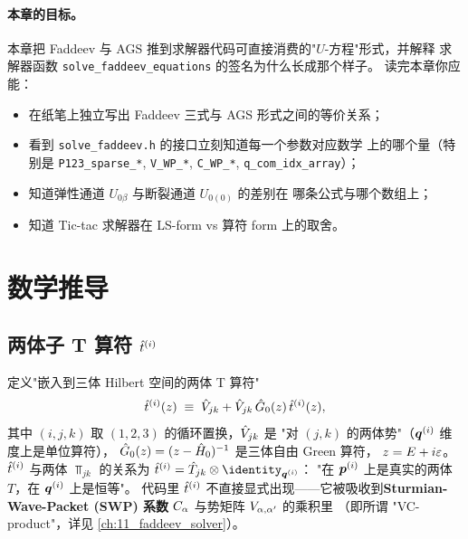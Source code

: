 \paragraph{本章的目标。}
本章把 Faddeev 与 AGS 推到求解器代码可直接消费的"\(U\)-方程"形式，并解释
求解器函数 \texttt{solve\_faddeev\_equations} 的签名为什么长成那个样子。
读完本章你应能：
\begin{itemize}
  \item 在纸笔上独立写出 Faddeev 三式与 AGS 形式之间的等价关系；
  \item 看到 \texttt{solve\_faddeev.h} 的接口立刻知道每一个参数对应数学
        上的哪个量（特别是 \texttt{P123\_sparse\_*}, \texttt{V\_WP\_*},
        \texttt{C\_WP\_*}, \texttt{q\_com\_idx\_array}）；
  \item 知道弹性通道 \(U_{0\beta}\) 与断裂通道 \(U_{0(0)}\) 的差别在
        哪条公式与哪个数组上；
  \item 知道 Tic-tac 求解器在 LS-form vs 算符 form 上的取舍。
\end{itemize}

\section{数学推导}
\label{sec:ch04-math}

\subsection{两体子 T 算符 \(\hat{t}^{(i)}\)}
\label{subsec:ch04-tsub}

定义"嵌入到三体 Hilbert 空间的两体 T 算符"
\begin{equation}
\label{eq:ch04-tsub-def}
\hat{t}^{(i)}(z) \;\equiv\; \hat{V}_{jk} + \hat{V}_{jk}\,\hat{G}_0(z)\,\hat{t}^{(i)}(z),
\end{equation}
其中 \((i, j, k)\) 取 \((1,2,3)\) 的循环置换，\(\hat{V}_{jk}\) 是
"对 \((j,k)\) 的两体势"（\(\bm{q}^{(i)}\) 维度上是单位算符），
\(\hat{G}_0(z) = (z - \hat{H}_0)^{-1}\) 是三体自由 Green 算符，
\(z = E + i\varepsilon\)。
\(\hat{t}^{(i)}\) 与两体 \(\Top_{jk}\) 的关系为
\(\Tsub{i} = \Top_{jk} \otimes \identity_{\bvec{q}^{(i)}}\)：
"在 \(\bm{p}^{(i)}\) 上是真实的两体 \(T\)，在 \(\bm{q}^{(i)}\) 上是恒等"。
代码里 \(\hat{t}^{(i)}\) 不直接显式出现——它被吸收到\textbf{Sturmian-Wave-Packet
(SWP) 系数} \(C_{\alpha}\) 与势矩阵 \(V_{\alpha, \alpha'}\) 的乘积里
（即所谓 "VC-product"，详见 \cref{ch:11_faddeev_solver}）。

